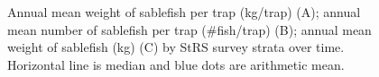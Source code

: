 \documentclass[12pt]{article}\usepackage[]{graphicx}\usepackage[]{color}
\begin{document}
\begin{figure}[htb]

{\centering {} 

}

\caption{Annual mean weight of sablefish per trap (kg/trap) (A); annual mean number of sablefish per trap (\#fish/trap) (B); annual mean weight of sablefish (kg) (C) by StRS survey strata over time. Horizontal line is median and blue dots are arithmetic mean.}\label{fig:figure10}
\end{figure}
\clearpage
\end{document}
